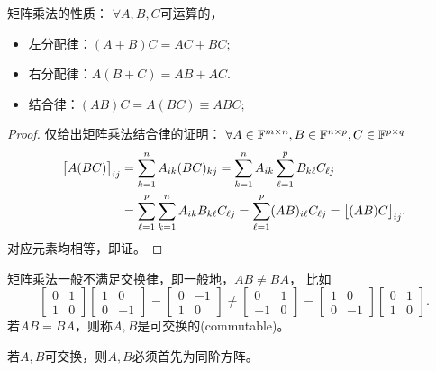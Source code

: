 \begin{corollary}
	矩阵乘法的性质：%
	$\forall A,B,C$可运算的，
    \begin{itemize}
    	\item 左分配律：$(A+B)C=AC+BC;$
    	\item 右分配律：$A(B+C)=AB+AC.$
        \item 结合律：$(AB)C=A(BC)\equiv ABC;$
    \end{itemize}
\end{corollary}

\begin{proof}
	仅给出矩阵乘法结合律的证明：
	$\forall A\in\mathbb F^{m\times n},B\in\mathbb F^{n\times p},C\in\mathbb F^{p\times q}$
	\begin{align*}
		\bigl[A(BC)\bigr]_{ij}&=\sum_{k=1}^nA_{ik}(BC)_{kj}=\sum_{k=1}^nA_{ik}\sum_{\ell=1}^pB_{k\ell}C_{\ell j}\\
		&=\sum_{\ell=1}^p\sum_{k=1}^nA_{ik}B_{k\ell}C_{\ell j}=\sum_{\ell=1}^p(AB)_{i\ell}C_{\ell j}=\bigl[(AB)C\bigr]_{ij}.
	\end{align*}
	对应元素均相等，即证。
\end{proof}

\begin{remark}
	矩阵乘法一般不满足交换律，即一般地，$AB\neq BA$，
	比如
	\[
		\begin{bmatrix}
			0&1\\1&0
		\end{bmatrix}\begin{bmatrix}
			1&0\\0&-1
		\end{bmatrix}=\begin{bmatrix}
			0&-1\\1&0
		\end{bmatrix}\neq\begin{bmatrix}
			0&1\\-1&0
		\end{bmatrix}=\begin{bmatrix}
			1&0\\0&-1
		\end{bmatrix}\begin{bmatrix}
			0&1\\1&0
		\end{bmatrix}.
	\]
	若$AB=BA$，则称$A,B$是可交换的(commutable)。
\end{remark}

\begin{corollary}
	若$A,B$可交换，则$A,B$必须首先为同阶方阵。
\end{corollary}


